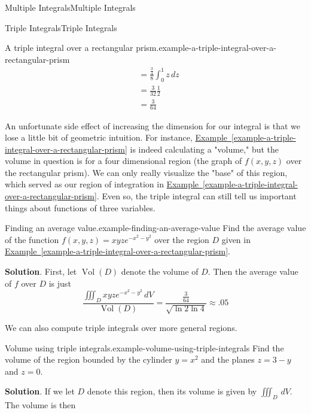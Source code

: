 \documentclass[10pt,]{book}
\numberwithin{equation}{section}
\begin{document}
\begin{chapterptx}{Multiple Integrals}{}{Multiple Integrals}{}{}
\begin{sectionptx}{Triple Integrals}{}{Triple Integrals}{}{}
\begin{example}{A triple integral over a rectangular prism.}{example-a-triple-integral-over-a-rectangular-prism}
\begin{align*}
& = \frac{\frac{3}{4}}{8}\int_{0}^{1}z\,dz \\
& = \frac{3}{32}\frac{1}{2} \\
& = \frac{3}{64} 
\end{align*}
%
\end{example}
\hypertarget{p-1293}{}%
An unfortunate side effect of increasing the dimension for our integral is that we lose a little bit of geometric intuition. For instance, \hyperref[example-a-triple-integral-over-a-rectangular-prism]{Example~\ref{example-a-triple-integral-over-a-rectangular-prism}} is indeed calculating a "volume," but the volume in question is for a four dimensional region (the graph of \(f(x,y,z)\) over the rectangular prism). We can only really visualize the "base" of this region, which served as our region of integration in \hyperref[example-a-triple-integral-over-a-rectangular-prism]{Example~\ref{example-a-triple-integral-over-a-rectangular-prism}}. Even so, the triple integral can still tell us important things about functions of three variables.%
\begin{example}{Finding an average value.}{example-finding-an-average-value}%
\hypertarget{p-1294}{}%
Find the average value of the function \(f(x,y,z) = xyze^{-x^{2} - y^{2}}\) over the region \(D\) given in \hyperref[example-a-triple-integral-over-a-rectangular-prism]{Example~\ref{example-a-triple-integral-over-a-rectangular-prism}}.%
\par\smallskip%
\noindent\textbf{Solution}.\hypertarget{solution-207}{}\quad%
\hypertarget{p-1295}{}%
First, let \(\operatorname{Vol}(D)\) denote the volume of \(D\). Then the average value of \(f\) over \(D\) is just%
\begin{equation*}
\frac{\iiint_{D}xyze^{-x^{2} - y^{2}}\,dV}{\operatorname{Vol}(D)} = \frac{\frac{3}{64}}{\sqrt{\ln2\ln4}} \approx .05
\end{equation*}
%
\end{example}
\hypertarget{p-1296}{}%
We can also compute triple integrals over more general regions.%
\begin{example}{Volume using triple integrals.}{example-volume-using-triple-integrals}%
\hypertarget{p-1297}{}%
Find the volume of the region bounded by the cylinder \(y = x^{2}\) and the planes \(z = 3-y\) and \(z=0\).%
\par\smallskip%
\noindent\textbf{Solution}.\hypertarget{solution-208}{}\quad%
\hypertarget{p-1298}{}%
If we let \(D\) denote this region, then its volume is given by \(\iiint_{D}\,dV\). The volume is then%
\begin{align*}

\end{align*}
\end{example}
\end{sectionptx}
\end{chapterptx}
\end{document}
